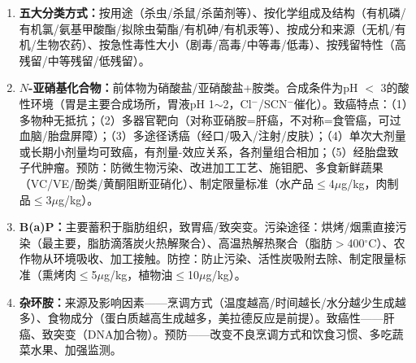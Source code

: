 {\begin{enumerate}[leftmargin=*, itemsep=6pt]
    \textbf{高温杀菌：}常压——100$^\circ$C以下，巴氏杀菌（低温63$^\circ$C/30min，高温短时72$^\circ$C/15s），处理牛乳/啤酒/酱油/葡萄酒；高压——100$\sim$121$^\circ$C（0.2 MPa），肉类制品/罐头，杀灭繁殖型和芽孢型；UHT——封闭系统加热至120$^\circ$C以上数秒后迅速冷却；微波——915 MHz（含水量高/体积大食品）、2450 MHz（含水量低食品），快速节能对品质影响小。

    \textbf{D值：}杀死90\%细菌所需时间（min）。金黄色葡萄球菌D$_{63}$=7，肉毒梭菌芽孢D$_{121}$=0.1$\sim$0.23。

    \textbf{干燥脱水：}水分降至15\%以下或Aw 0.00$\sim$0.60，抑制各种微生物生长。方法：日晒、阴干、喷雾干燥、减压蒸发、冷冻干燥。酶性褐变——酚酶催化酚类形成醌。非酶褐变/Maillard反应——氨基与羰基反应，Aw 0.6最适于褐变，加热与给氧促进褐变，SO$_2$可阻止褐变。

    \textbf{辐照保藏：}辐照灭菌——高剂量10$\sim$15/50 kGy，杀灭所有微生物达到商业无菌；辐照消毒——中等剂量5$\sim$10 kGy，杀灭无芽孢致病菌（沙门菌等），3天内不发虫霉变；辐照防腐——低剂量1$\sim$5 kGy，杀灭腐败菌，延长后熟期及保藏期（抑制发芽、杀虫）。

    \item \textbf{五大分类方式：}按用途（杀虫/杀鼠/杀菌剂等）、按化学组成及结构（有机磷/有机氯/氨基甲酸酯/拟除虫菊酯/有机砷/有机汞等）、按成分和来源（无机/有机/生物农药）、按急性毒性大小（剧毒/高毒/中等毒/低毒）、按残留特性（高残留/中等残留/低残留）。

    \item \textbf{$N$-亚硝基化合物：}前体物为硝酸盐/亚硝酸盐+胺类。合成条件为pH $<$ 3的酸性环境（胃是主要合成场所，胃液pH 1$\sim$2，Cl$^-$/SCN$^-$催化）。致癌特点：（1）多物种无抵抗；（2）多器官靶向（对称亚硝胺=肝癌，不对称=食管癌，可过血脑/胎盘屏障）；（3）多途径诱癌（经口/吸入/注射/皮肤）；（4）单次大剂量或长期小剂量均可致癌，有剂量-效应关系，各剂量组合相加；（5）经胎盘致子代肿瘤。预防：防微生物污染、改进加工工艺、施钼肥、多食新鲜蔬果（VC/VE/酚类/黄酮阻断亚硝化）、制定限量标准（水产品$\leq$4$\mu$g/kg，肉制品$\leq$3$\mu$g/kg）。

    \item \textbf{B(a)P：}主要蓄积于脂肪组织，致胃癌/致突变。污染途径：烘烤/烟熏直接污染（最主要，脂肪滴落炭火热解聚合）、高温热解热聚合（脂肪$>$400$^\circ$C）、农作物从环境吸收、加工接触。防控：防止污染、活性炭吸附去除、制定限量标准（熏烤肉$\leq$5$\mu$g/kg，植物油$\leq$10$\mu$g/kg）。

    \item \textbf{杂环胺：}来源及影响因素——烹调方式（温度越高/时间越长/水分越少生成越多）、食物成分（蛋白质越高生成越多，美拉德反应是前提）。致癌性——肝癌、致突变（DNA加合物）。预防——改变不良烹调方式和饮食习惯、多吃蔬菜水果、加强监测。


\end{enumerate}}
